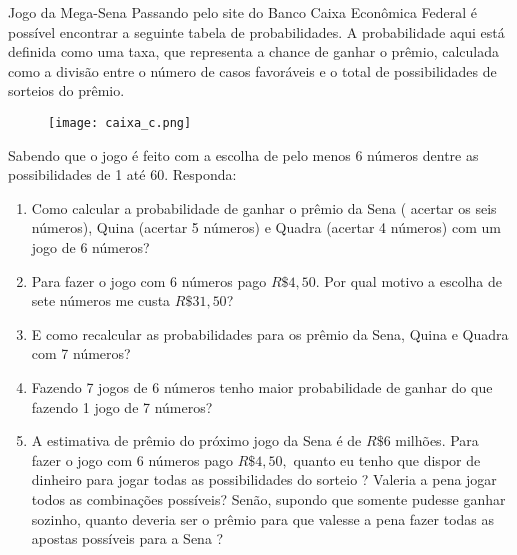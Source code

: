 \begin{task}{Jogo da Mega-Sena}
Passando pelo site do Banco Caixa Econômica Federal é possível encontrar a seguinte tabela de probabilidades. A probabilidade aqui está definida como uma taxa, que representa a chance de ganhar o prêmio, calculada como a divisão entre o número de casos favoráveis e o total de possibilidades de sorteios do prêmio.  
  

\begin{figure}[H]
\centering

\texttt{[image: caixa\_c.png]}
\end{figure}


Sabendo que o jogo é feito com a escolha de pelo menos 6 números dentre as possibilidades de 1 até 60. Responda:

 \begin{enumerate}
     \item Como calcular a probabilidade de ganhar o prêmio da Sena ( acertar os seis números), Quina (acertar 5 números) e Quadra (acertar 4 números) com um jogo de 6 números?
     \item Para fazer o jogo com 6 números pago $R\$4,50$. Por qual motivo a escolha de sete números me custa  $R\$31,50$?
     \item E como recalcular as probabilidades para os prêmio da Sena, Quina e Quadra com 7 números?
     \item Fazendo 7 jogos de 6 números tenho maior probabilidade de ganhar do que fazendo 1 jogo de 7 números?
     \item A estimativa de prêmio do próximo jogo da Sena é de $R\$ 6$ milhões. Para fazer o jogo com 6 números pago $R\$4,50,$ quanto eu tenho que dispor de dinheiro para jogar todas as possibilidades do sorteio ? Valeria a pena jogar todos as combinações possíveis? Senão, supondo que somente pudesse ganhar sozinho, quanto deveria ser o prêmio para que valesse a pena fazer todas as apostas possíveis para a Sena ?
\end{enumerate}
\end{task}
\clearpage


